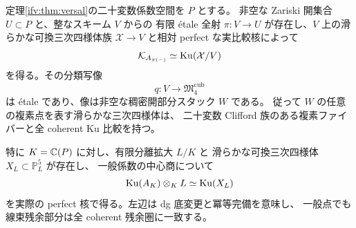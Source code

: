 \begin{corollary}[稠密開の可換実現と一般係数での有限比較]
\label{ifv:cor:generic-comparison}
定理\ref{ifv:thm:versal}の二十変数係数空間を $P$ とする。
非空な Zariski 開集合 $U\subset P$ と、整なスキーム $V$ からの
有限 \'etale 全射 $\pi:V\to U$ が存在し、$V$ 上の滑らかな可換三次四様体族
$\mathcal X\to V$ と相対 perfect な実比較核によって
\[
        \mathcal K_{A_{\pi(-)}}\simeq\operatorname{Ku}(\mathcal X/V)
\]
を得る。その分類写像
\[
        q:V\longrightarrow\mathfrak M_4^{\mathrm{cub}}
\]
は \'etale であり、像は非空な稠密開部分スタック $W$ である。
従って $W$ の任意の複素点を表す滑らかな三次四様体は、
二十変数 Clifford 族のある複素ファイバーと全 coherent Ku 比較を持つ。

特に $K=\mathbb C(P)$ に対し、有限分離拡大 $L/K$ と
滑らかな可換三次四様体 $X_L\subset\mathbb P^5_L$ が存在し、
一般係数の中心商について
\[
       \operatorname{Ku}(A_K)\otimes_K L\simeq\operatorname{Ku}(X_L)
\]
を実際の perfect 核で得る。左辺は dg 底変更と冪等完備を意味し、
一般点でも線束残余部分は全 coherent 残余圏に一致する。
\end{corollary}

